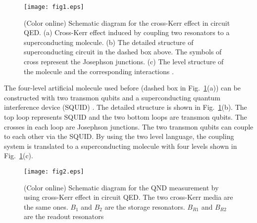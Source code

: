 \documentclass[preprintnumbers,showkeys,amsmath,amssymb]{revtex4}%
\begin{document}
\begin{figure}[!ht]%
\centering\texttt{[image: fig1.eps]}
\caption{(Color online) Schematic diagram for the cross-Kerr effect in circuit QED.
(a) Cross-Kerr effect induced by coupling two resonators to a
superconducting molecule. (b) The detailed structure of
superconducting circuit in the dashed box above. The symbols of
cross represent the Josephson junctions. (c) The level structure of
the molecule and the corresponding interactions \cite{YHu}.}
\label{crosskerr}
\end{figure}



The four-level artificial molecule \cite{YHu} used before (dashed
box in Fig.~\ref{crosskerr}(a)) can be constructed with two transmon
qubits \cite{JKoch} and a superconducting quantum interference
device (SQUID) \cite{JSiewert}. The detailed structure is shown in
Fig.~\ref{crosskerr}(b). The top loop represents SQUID and the two
bottom loops are transmon qubits. The crosses in each loop are
Josephson junctions. The two transmon qubits can couple to each
other via the SQUID. By using the two level language, the coupling
system is translated to a superconducting molecule \cite{YHu,JKoch}
with four levels shown in Fig.~\ref{crosskerr}(c).




\begin{figure}[!ht]%
\texttt{[image: fig2.eps]}
\centering\caption{(Color online) Schematic diagram for the QND measurement by using
cross-Kerr effect in circuit QED. The two cross-Kerr media are the
same ones. $B_{1}$ and $B_{2}$ are the storage resonators. $B_{R1}$
and $B_{R2}$ are the readout resonators} \label{QND}
\end{figure}
\end{document}
